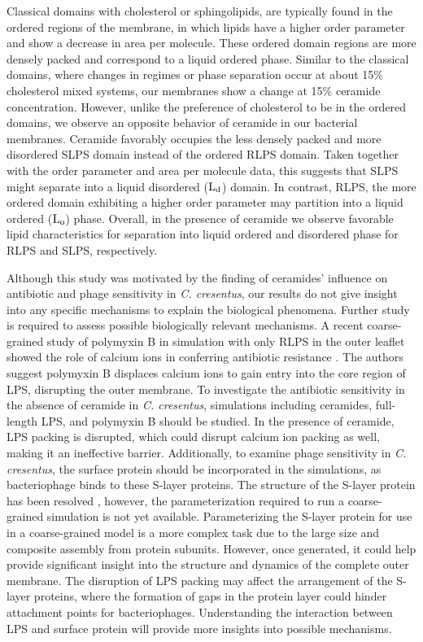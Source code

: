 \documentclass[10pt, letterpaper]{article}
\begin{document}
\par Classical domains with cholesterol or sphingolipids, are typically found in the ordered regions of the membrane, in which lipids have a higher order parameter and show a decrease in area per molecule. These ordered domain regions are more densely packed and correspond to a liquid ordered phase. Similar to the classical domains, where changes in regimes or phase separation occur at about 15\% cholesterol mixed systems, our membranes show a change at 15\% ceramide concentration. However, unlike the preference of cholesterol to be in the ordered domains, we observe an opposite behavior of ceramide in our bacterial membranes. Ceramide favorably occupies the less densely packed and more disordered SLPS domain instead of the ordered RLPS domain. Taken together with the order parameter and area per molecule data, this suggests that SLPS might separate into a liquid disordered ($\rm L_d$) domain. In contrast, RLPS, the more ordered domain exhibiting a higher order parameter may partition into a liquid ordered ($\rm L_o$) phase. Overall, in the presence of ceramide we observe favorable lipid characteristics for separation into liquid ordered and disordered phase for RLPS and SLPS, respectively.

Although this study was motivated by the finding of ceramides' influence on antibiotic and phage sensitivity in \textit{C. cresentus}, our results do not give insight into any specific mechanisms to explain the biological phenomena. Further study is required to assess possible biologically relevant mechanisms. A recent coarse-grained study of polymyxin B in simulation with only RLPS in the outer leaflet showed the role of calcium ions in conferring antibiotic resistance \cite{jiang2021coarse}. The authors suggest polymyxin B displaces calcium ions to gain entry into the core region of LPS, disrupting the outer membrane. To investigate the antibiotic sensitivity in the absence of ceramide in \textit{C. cresentus}, simulations including ceramides, full-length LPS, and polymyxin B should be studied. In the presence of ceramide, LPS packing is disrupted, which could disrupt calcium ion packing as well, making it an ineffective barrier. 
Additionally, to examine phage sensitivity in \textit{C. cresentus}, the surface protein should be incorporated in the simulations, as bacteriophage binds to these S-layer proteins. The structure of the S-layer protein has been resolved \cite{bharat2017structure}, however, the parameterization required to run a coarse-grained simulation is not yet available. Parameterizing the S-layer protein for use in a coarse-grained model is a more complex task due to the large size and composite assembly from protein subunits. However, once generated, it could help provide significant insight into the structure and dynamics of the complete outer membrane. The disruption of LPS packing may affect the arrangement of the S-layer proteins, where the formation of gaps in the protein layer could hinder attachment points for bacteriophages. Understanding the interaction between LPS and surface protein will provide more insights into possible mechanisms. 
\end{document}
